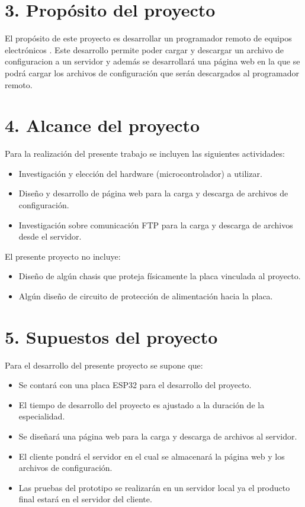 \documentclass[
11pt, %
]{charter}
\begin{document}
\section{3. Propósito del proyecto}
\label{sec:proposito}


El propósito de este proyecto es desarrollar un programador remoto de equipos electrónicos . Este desarrollo permite poder cargar y descargar un archivo de configuracion a un servidor y además se desarrollará una página web en la que se podrá cargar los archivos de configuración que serán descargados al programador remoto.


\section{4. Alcance del proyecto}
\label{sec:alcance}

Para la realización del presente trabajo se incluyen las siguientes actividades:

\begin{itemize}
	\item Investigación y elección del hardware (microcontrolador) a utilizar.
	\item Diseño y desarrollo de página web para la carga y descarga de archivos de configuración.
	\item Investigación sobre comunicación FTP para la carga y descarga de archivos desde el servidor.
\end{itemize}

El presente proyecto no incluye:

\begin{itemize}
	\item Diseño de algún chasis que proteja físicamente la placa vinculada al proyecto.
	\item Algún diseño de circuito de protección de alimentación hacia la placa.
\end{itemize}


\section{5. Supuestos del proyecto}
\label{sec:supuestos}


Para el desarrollo del presente proyecto se supone que:

\begin{itemize}
	\item Se contará con una placa ESP32 para el desarrollo del proyecto.
	\item El tiempo de desarrollo del proyecto es ajustado a la duración de la especialidad.
	 \item Se diseñará una página web para la carga y descarga de archivos al servidor.
	 \item El cliente pondrá el servidor en el cual se almacenará la página web y los archivos de configuración.
	 \item Las pruebas del prototipo se realizarán en un servidor local ya el producto final estará en el servidor del cliente.
\end{itemize}
\end{document}
